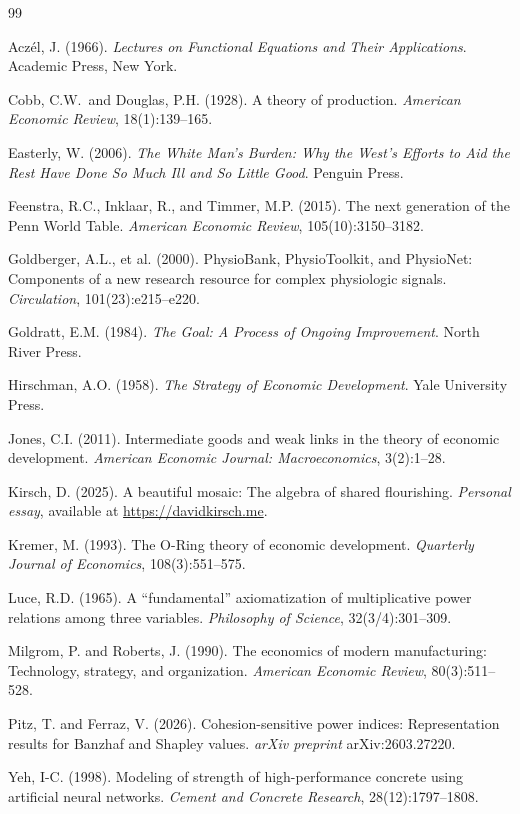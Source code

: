 \documentclass[12pt, a4paper]{article}
\theoremstyle{definition}
\theoremstyle{remark}
\begin{document}
\begin{thebibliography}{99}

Acz\'el, J. (1966). \textit{Lectures on Functional Equations and Their Applications}. Academic Press, New York.

Cobb, C.W.\ and Douglas, P.H. (1928). A theory of production. \textit{American Economic Review}, 18(1):139--165.

Easterly, W. (2006). \textit{The White Man's Burden: Why the West's Efforts to Aid the Rest Have Done So Much Ill and So Little Good}. Penguin Press.

Feenstra, R.C., Inklaar, R., and Timmer, M.P. (2015). The next generation of the Penn World Table. \textit{American Economic Review}, 105(10):3150--3182.

Goldberger, A.L., et al. (2000). PhysioBank, PhysioToolkit, and PhysioNet: Components of a new research resource for complex physiologic signals. \textit{Circulation}, 101(23):e215--e220.

Goldratt, E.M. (1984). \textit{The Goal: A Process of Ongoing Improvement}. North River Press.

Hirschman, A.O. (1958). \textit{The Strategy of Economic Development}. Yale University Press.

Jones, C.I. (2011). Intermediate goods and weak links in the theory of economic development. \textit{American Economic Journal: Macroeconomics}, 3(2):1--28.

Kirsch, D. (2025). A beautiful mosaic: The algebra of shared flourishing. \textit{Personal essay}, available at \url{https://davidkirsch.me}.

Kremer, M. (1993). The O-Ring theory of economic development. \textit{Quarterly Journal of Economics}, 108(3):551--575.

Luce, R.D. (1965). A ``fundamental'' axiomatization of multiplicative power relations among three variables. \textit{Philosophy of Science}, 32(3/4):301--309.

Milgrom, P. and Roberts, J. (1990). The economics of modern manufacturing: Technology, strategy, and organization. \textit{American Economic Review}, 80(3):511--528.

Pitz, T. and Ferraz, V. (2026). Cohesion-sensitive power indices: Representation results for Banzhaf and Shapley values. \textit{arXiv preprint} arXiv:2603.27220.

Yeh, I-C. (1998). Modeling of strength of high-performance concrete using artificial neural networks. \textit{Cement and Concrete Research}, 28(12):1797--1808.

\end{thebibliography}
\end{document}
